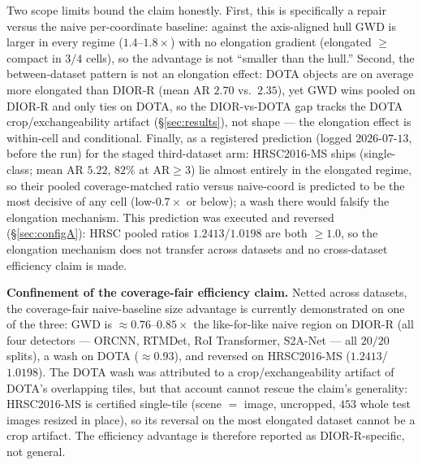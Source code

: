 \documentclass[journal]{IEEEtran}
\begin{document}
Two scope limits bound the claim honestly. First, this is specifically a repair versus the naive
per-coordinate baseline: against the axis-aligned hull GWD is larger in every regime
($1.4$--$1.8\times$) with no elongation gradient (elongated $\ge$ compact in $3/4$ cells), so the
advantage is not ``smaller than the hull.'' Second, the between-dataset pattern is not an
elongation effect: DOTA objects are on average more elongated than DIOR-R (mean AR $2.70$ vs.\
$2.35$), yet GWD wins pooled on DIOR-R and only ties on DOTA, so the DIOR-vs-DOTA gap tracks the DOTA
crop/exchangeability artifact (\S\ref{sec:results}), not shape --- the elongation effect is
within-cell and conditional. Finally, as a registered prediction
(logged $2026$-$07$-$13$, before the run) for the staged third-dataset arm: HRSC2016-MS ships
(single-class; mean AR $5.22$, $82\%$ at $\mathrm{AR}\ge3$) lie almost entirely in the elongated regime,
so their pooled coverage-matched ratio versus naive-coord is predicted to be the most decisive of
any cell (low-$0.7\times$ or below); a wash there would falsify the elongation mechanism. This prediction
was executed and reversed (\S\ref{sec:configA}): HRSC pooled ratios $1.2413$/$1.0198$ are both
$\ge1.0$, so the elongation mechanism does not transfer across datasets and no cross-dataset efficiency
claim is made.

\textbf{Confinement of the coverage-fair efficiency claim.} Netted across datasets, the coverage-fair
naive-baseline size advantage is currently demonstrated on one of the three: GWD is
$\approx0.76$--$0.85\times$ the like-for-like naive region on DIOR-R (all four detectors --- ORCNN, RTMDet,
RoI Transformer, S2A-Net --- all $20/20$ splits), a
wash on DOTA ($\approx0.93$), and reversed on HRSC2016-MS ($1.2413$/$1.0198$). The DOTA wash was
attributed to a crop/exchangeability artifact of DOTA's overlapping tiles, but that account cannot rescue the
claim's generality: HRSC2016-MS is certified single-tile (scene $=$ image, uncropped, $453$ whole test
images resized in place), so its reversal on the most elongated dataset cannot be a crop artifact. The
efficiency advantage is therefore reported as DIOR-R-specific, not general.
\end{document}
